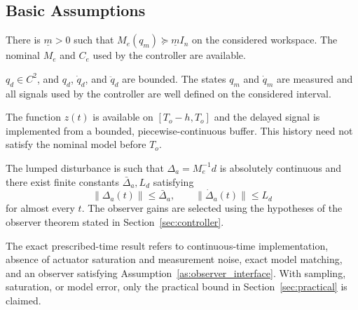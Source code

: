 \subsection{Basic Assumptions}
\begin{assumption}\label{as:inertia}
There is $\underline m>0$ such that
$M_e(q_m)\succeq\underline m I_n$ on the considered workspace. The nominal
$M_e$ and $C_e$ used by the controller are available.
\end{assumption}
\begin{assumption}\label{as:reference}
$q_d\in C^2$, and $q_d$, $\dot q_d$, and $\ddot q_d$ are bounded. The states
$q_m$ and $\dot q_m$ are measured and all signals used by the controller are
well defined on the considered interval.
\end{assumption}
\begin{assumption}\label{as:delay_history}
The function $z(t)$ is available on $[T_o-h,T_o]$ and the delayed signal is
implemented from a bounded, piecewise-continuous buffer. This history need not
satisfy the nominal model before $T_o$.
\end{assumption}
\begin{assumption}\label{as:disturbance}
The lumped disturbance is such that $\Delta_a=M_e^{-1}d$ is absolutely
continuous and there exist finite constants $\bar\Delta_a,L_d$ satisfying
\begin{equation}
 \|\Delta_a(t)\|\leq\bar\Delta_a,\qquad
 \|\dot\Delta_a(t)\|\leq L_d
\end{equation}
for almost every $t$. The observer gains are selected using the hypotheses of
the observer theorem stated in Section~\ref{sec:controller}.
\end{assumption}
\begin{assumption}\label{as:ideal}
The exact prescribed-time result refers to continuous-time implementation,
absence of actuator saturation and measurement noise, exact model matching,
and an observer satisfying Assumption~\ref{as:observer_interface}. With
sampling, saturation, or model error, only the practical bound in
Section~\ref{sec:practical} is claimed.
\end{assumption}

